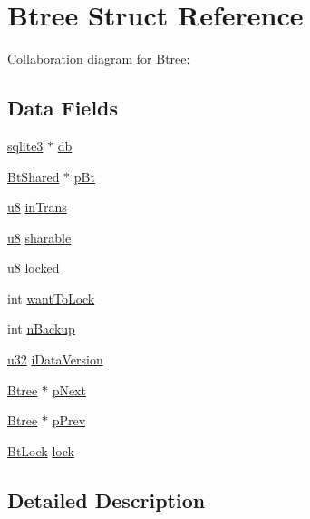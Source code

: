 \hypertarget{struct_btree}{}\section{Btree Struct Reference}
\label{struct_btree}


Collaboration diagram for Btree\+:
\subsection*{Data Fields}
\begin{DoxyCompactItemize}
\item 
\hyperlink{structsqlite3}{sqlite3} $\ast$ \hyperlink{struct_btree_ad6e663497d2c934364b3bcf07496b30b}{db}
\item 
\hyperlink{struct_bt_shared}{Bt\+Shared} $\ast$ \hyperlink{struct_btree_a2bc66d19c064bb25ff335241f8c621df}{p\+Bt}
\item 
\hyperlink{sqlite3_8c_a74a0f6424ae628af25f23f0a35f6ead3}{u8} \hyperlink{struct_btree_a2c8099ca044cfb9efe8e8f1868335882}{in\+Trans}
\item 
\hyperlink{sqlite3_8c_a74a0f6424ae628af25f23f0a35f6ead3}{u8} \hyperlink{struct_btree_a31049bc7f1be67cb3456bbb3ac791f99}{sharable}
\item 
\hyperlink{sqlite3_8c_a74a0f6424ae628af25f23f0a35f6ead3}{u8} \hyperlink{struct_btree_a43f3e82288339ce627521922c87afa2d}{locked}
\item 
int \hyperlink{struct_btree_a97898981f2186862b2aeaa212556fa07}{want\+To\+Lock}
\item 
int \hyperlink{struct_btree_a0368c820089e3c6f7bc698c6bbe82339}{n\+Backup}
\item 
\hyperlink{sqlite3_8c_a03ad5adfaeb9b7640dde78a0cc390319}{u32} \hyperlink{struct_btree_a3a60e67667c7473065ef0c3a8785c6ea}{i\+Data\+Version}
\item 
\hyperlink{struct_btree}{Btree} $\ast$ \hyperlink{struct_btree_a685ec01d7281c1aee9e1621da9fdc6e6}{p\+Next}
\item 
\hyperlink{struct_btree}{Btree} $\ast$ \hyperlink{struct_btree_a5073b2001300b8d13b12d202d174569d}{p\+Prev}
\item 
\hyperlink{struct_bt_lock}{Bt\+Lock} \hyperlink{struct_btree_a6e91b33e34747daf58cc28ca4994925b}{lock}
\end{DoxyCompactItemize}


\subsection{Detailed Description}


